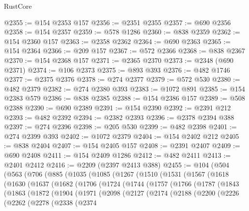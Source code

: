 \begin{lexlean}{RustCore}
\begin{coremodule}
@2355 := @154 @2353 @157
@2356 := @2351 @2355
@2357 := @690 @2356
@2358 := @154 @2357
@2359 := @578 @1286
@2360 := @838 @2359
@2362 := @154 @2360 @157
@2363 := @2358 @2362
@2364 := @690 @2363
@2365 := @154 @2364
@2366 := @209 @157
@2367 := @572 @2366
@2368 := @838 @2367
@2370 := @154 @2368 @157
@2371 := @2365 @2370
@2373 := @2348 (@690 @2371)
@2374 := @106 @2373
@2375 := @893 @393
@2376 := @482 @1746
@2377 := @2375 @2376
@2378 := @274 @2377
@2379 := @572 @530
@2380 := @482 @2379
@2382 := @274 @2380 @393
@2383 := @1072 @891
@2385 := @154 @2383 @579
@2386 := @838 @2385
@2388 := @154 @2386 @157
@2389 := @508 @2388
@2390 := @690 @2389
@2391 := @154 @2390
@2392 := @2391 @212
@2393 := @482 @2392
@2394 := @2382 @2393
@2396 := @2378 @2394 @388
@2397 := @274 @2396
@2398 := @205 @530
@2399 := @482 @2398
@2401 := @274 @2399 @393
@2402 := @1072 @2379
@2404 := @154 @2402 @212
@2405 := @838 @2404
@2407 := @154 @2405 @157
@2408 := @2391 @2407
@2409 := @690 @2408
@2411 := @154 @2409 @1286
@2412 := @482 @2411
@2413 := @2401 @2412
@2416 := @2209 (@2397 @2413 @388)
@2455 := @104
    (@504
      (@563
        (@706
          (@885
            (@1035
              (@1085
                (@1267
                  (@1510
                    (@1531
                      (@1567
                        (@1618
                          (@1630
                            (@1637
                              (@1682
                                (@1706
                                  (@1724
                                    (@1744
                                      (@1757
                                        (@1766
                                          (@1787
                                            (@1843
                                              (@1863
                                                (@1872
                                                  (@1904
                                                    (@1971
                                                      (@2098
                                                        (@2127
                                                          (@2174
                                                            (@2188
                                                              (@2200
                                                                (@2226
                                                                  (@2262
                                                                    (@2278
                                                                      (@2338
                                                                        (@2374

\end{coremodule}
\end{lexlean}
